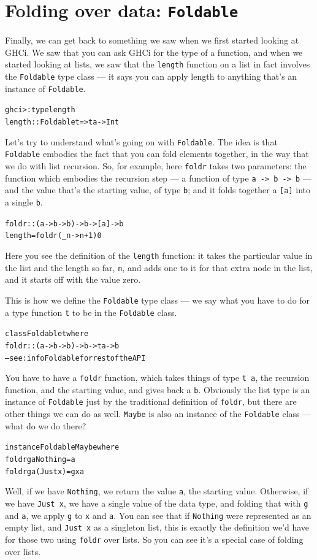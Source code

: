 \section{Folding over data: \texttt{Foldable}}
\label{foldable}

Finally, we can get back to something we saw when we first started looking at GHCi. We saw that you can ask GHCi for the type of a function, and when we started looking at lists, we saw that the \texttt{length} function on a list in fact involves the \texttt{Foldable} type class — it says you can apply length to anything that's an instance of \texttt{Foldable}. 
\begin{alltt}
ghci> :type length
length :: Foldable t => t a -> Int
\end{alltt}
Let's try to understand what's going on with \texttt{Foldable}. 
The idea is that \texttt{Foldable} embodies the fact that you can fold elements together, in the way that we do with list recursion. So, for example, here \texttt{foldr} takes two parameters: the function which embodies the recursion step — a function of type \texttt{a -> b -> b} — and the value that's the starting value, of type \texttt{b}; and it folds together a \texttt{[a]} into a single \texttt{b}. 
\begin{alltt}
foldr :: (a -> b -> b) -> b -> [a] -> b
length = foldr (\bs{}\_ n -> n+1) 0
\end{alltt}
Here you see the definition of the \texttt{length} function: it takes the particular value in the list and the length so far, \texttt{n}, and adds one to it for that extra node in the list, and it starts off with the value zero. 

This is how we define the \texttt{Foldable} type class — we say what you have to do for a type function \texttt{t} to be in the \texttt{Foldable} class.
\begin{alltt}
class Foldable t where
  foldr :: (a -> b -> b) -> b -> t a -> b
  -- see :info Foldable for rest of the API
\end{alltt}
You have to have a \texttt{foldr} function, which takes things of type \texttt{t a}, the recursion function, and the starting value, and gives back a \texttt{b}. Obviously the list type is an instance of \texttt{Foldable} just by the traditional definition of \texttt{foldr}, but there are other things we can do as well. \texttt{Maybe} is also an instance of the \texttt{Foldable} class — what do we do there?
\begin{alltt}
instance Foldable Maybe where
  foldr g a Nothing  = a
  foldr g a (Just x) = g x a
\end{alltt}
Well, if we have \texttt{Nothing}, we return the value \texttt{a}, the starting value. Otherwise, if we have \texttt{Just x}, we have a single value of the data type, and folding that with \texttt{g} and \texttt{a}, we apply \texttt{g} to \texttt{x} and \texttt{a}. You can see that if \texttt{Nothing} were represented as an empty list, and \texttt{Just x} as a singleton list, this is exactly the definition we'd have for those two using \texttt{foldr} over lists. So you can see it's a special case of folding over lists.

